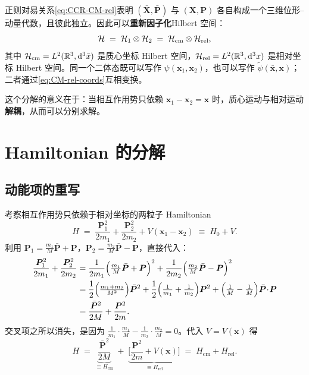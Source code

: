 正则对易关系\eqref{eq:CCR-CM-rel}表明 $(\bar{\bm{X}},\bar{\bm{P}})$ 与 $(\bm{X},\bm{P})$ 各自构成一个三维位形–动量代数，且彼此独立。因此可以\textbf{重新因子化}\:Hilbert 空间：
\begin{equation}
  \mathcal{H} \;=\; \mathcal{H}_1 \otimes \mathcal{H}_2 \;=\; \mathcal{H}_{\text{cm}} \otimes \mathcal{H}_{\text{rel}},
  \label{eq:cm-rel-factorization}
\end{equation}
其中 $\mathcal{H}_{\text{cm}} = L^2(\mathbb{R}^3,\mathrm{d}^3\bar{x})$ 是质心坐标 Hilbert 空间，$\mathcal{H}_{\text{rel}} = L^2(\mathbb{R}^3,\mathrm{d}^3 x)$ 是相对坐标 Hilbert 空间。同一个二体态既可以写作 $\psi(\bm{x}_1,\bm{x}_2)$，也可以写作 $\widetilde\psi(\bar{\bm{x}},\bm{x})$；二者通过\eqref{eq:CM-rel-coords}互相变换。

\begin{remark}
  这个分解的意义在于：当相互作用势只依赖 $\bm{x}_1-\bm{x}_2=\bm{x}$ 时，质心运动与相对运动\textbf{解耦}，从而可以分别求解。
\end{remark}

\section{Hamiltonian 的分解}

\subsection{动能项的重写}

考察相互作用势只依赖于相对坐标的两粒子 Hamiltonian
\begin{equation}
  H \;=\; \frac{\bm{P}_1^2}{2m_1} + \frac{\bm{P}_2^2}{2m_2} + V(\bm{x}_1-\bm{x}_2)
       \;\equiv\; H_0 + V.
  \label{eq:full-Hamiltonian-2p}
\end{equation}
利用 $\bm{P}_1=\frac{m_1}{M}\bar{\bm{P}}+\bm{P}$，$\bm{P}_2=\frac{m_2}{M}\bar{\bm{P}}-\bm{P}$，直接代入：
\begin{align}
  \frac{\bm{P}_1^2}{2m_1}+\frac{\bm{P}_2^2}{2m_2}
  &= \frac{1}{2m_1}\Big(\tfrac{m_1}{M}\bar{\bm{P}}+\bm{P}\Big)^2
    +\frac{1}{2m_2}\Big(\tfrac{m_2}{M}\bar{\bm{P}}-\bm{P}\Big)^2 \notag\\
  &= \frac{1}{2}\Big(\tfrac{m_1+m_2}{M^2}\Big)\bar{\bm{P}}^2
    + \frac{1}{2}\Big(\tfrac{1}{m_1}+\tfrac{1}{m_2}\Big)\bm{P}^2
    + \Big(\tfrac{1}{M}-\tfrac{1}{M}\Big)\bar{\bm{P}}\!\cdot\!\bm{P} \notag\\
  &= \frac{\bar{\bm{P}}^2}{2M} + \frac{\bm{P}^2}{2m}.
  \label{eq:KE-decomposition}
\end{align}
交叉项之所以消失，是因为 $\frac{1}{m_1}\cdot\frac{m_1}{M}-\frac{1}{m_2}\cdot\frac{m_2}{M}=0$。代入 $V=V(\bm{x})$ 得
\begin{equation}
  \boxed{
    H \;=\; \underbrace{\frac{\bar{\bm{P}}^2}{2M}}_{\equiv H_{\text{cm}}}
       \;+\; \underbrace{\Big[\frac{\bm{P}^2}{2m} + V(\bm{x})\Big]}_{\equiv H_{\text{rel}}}
       \;=\; H_{\text{cm}} + H_{\text{rel}}.
  }
  \label{eq:H-decomposition}
\end{equation}

